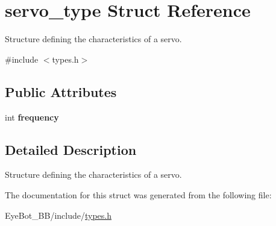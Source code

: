 \hypertarget{structservo__type}{\section{servo\-\_\-type \-Struct \-Reference}
\label{structservo__type}
}


\-Structure defining the characteristics of a servo.  




{\ttfamily \#include $<$types.\-h$>$}

\subsection*{\-Public \-Attributes}
\begin{DoxyCompactItemize}
\item 
\hypertarget{structservo__type_a5f50d251127250380f73d4a67e2ac8b9}{int {\bfseries frequency}}\label{structservo__type_a5f50d251127250380f73d4a67e2ac8b9}

\end{DoxyCompactItemize}


\subsection{\-Detailed \-Description}
\-Structure defining the characteristics of a servo. 

\-The documentation for this struct was generated from the following file\-:\begin{DoxyCompactItemize}
\item 
\-Eye\-Bot\-\_\-\-B\-B/include/\hyperlink{types_8h}{types.\-h}\end{DoxyCompactItemize}
